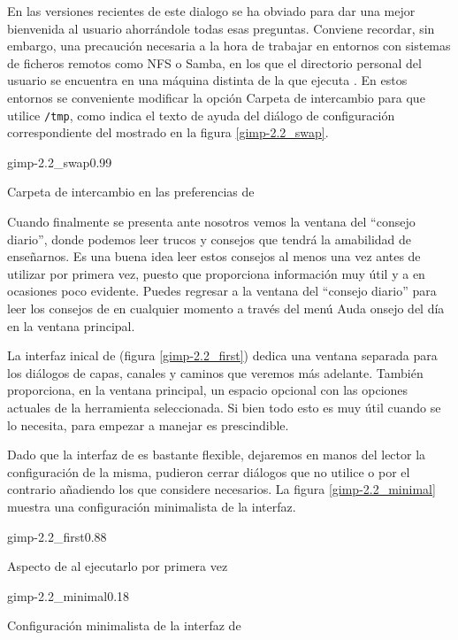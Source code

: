 En las versiones recientes de \gimp este dialogo se ha obviado para dar una
mejor bienvenida al usuario ahorrándole todas esas preguntas. Conviene recordar,
sin embargo, una precaución necesaria a la hora de trabajar en entornos
con sistemas de ficheros remotos como NFS o Samba, en los que el directorio
personal del usuario se encuentra en una máquina distinta de la que ejecuta
\gimp. En estos entornos se conveniente modificar la opción {\sf Carpeta
de intercambio} para que utilice {\tt /tmp}, como indica el texto de ayuda
del diálogo de configuración correspondiente del \gimp
mostrado en la figura \ref{gimp-2.2_swap}.

\begin{figura}{gimp-2.2_swap}{0.99}
\caption{Carpeta de intercambio en las preferencias de }
\end{figura}




Cuando finalmente \gimp se presenta ante nosotros vemos la ventana del
``consejo diario'',  donde podemos  leer trucos  y consejos  que \gimp
tendrá la amabilidad de enseñarnos. Es una buena idea leer estos consejos
al menos una vez antes de utilizar \gimp por primera vez, puesto que
proporciona información muy útil y a en ocasiones poco evidente.
%
Puedes regresar a la ventana del ``consejo diario'' para leer
los consejos de \gimp en cualquier momento a través del menú
\textsf{Auda} \lyxarrow{} \textsf{onsejo del día} 
en la ventana principal.

La interfaz inical de \gimp (figura \ref{gimp-2.2_first})
dedica una ventana separada para los diálogos
de capas, canales y caminos que veremos más adelante. También proporciona,
en la ventana principal, un espacio opcional con las opciones actuales
de la herramienta seleccionada. Si bien todo esto es muy útil cuando se lo
necesita, para empezar a manejar \gimp es prescindible. 

Dado que la interfaz de \gimp es bastante flexible, dejaremos en manos
del lector la configuración de la misma, pudieron cerrar diálogos que
no utilice o por el contrario añadiendo los que considere necesarios.
La figura \ref{gimp-2.2_minimal} muestra una configuración minimalista
de la interfaz.

\begin{figura}{gimp-2.2_first}{0.88}
\caption{Aspecto de  al ejecutarlo por primera vez}
\end{figura}

\begin{figura}{gimp-2.2_minimal}{0.18}
\caption{Configuración minimalista de la interfaz de }
\end{figura}




